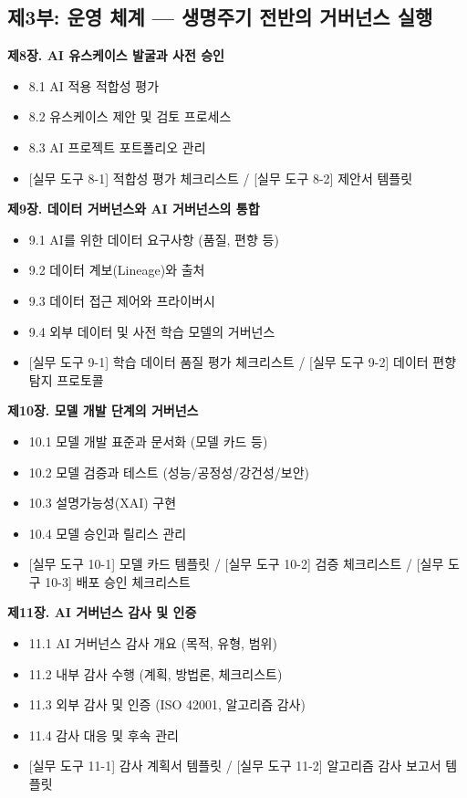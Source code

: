 \vspace{0.5cm}
\subsection*{제3부: 운영 체계 --- 생명주기 전반의 거버넌스 실행}

\textbf{제8장. AI 유스케이스 발굴과 사전 승인}
\begin{itemize}
 \item 8.1 AI 적용 적합성 평가
 \item 8.2 유스케이스 제안 및 검토 프로세스
 \item 8.3 AI 프로젝트 포트폴리오 관리
 \item {[실무 도구 8-1] 적합성 평가 체크리스트} / {[실무 도구 8-2] 제안서 템플릿}
\end{itemize}

\medskip
\textbf{제9장. 데이터 거버넌스와 AI 거버넌스의 통합}
\begin{itemize}
 \item 9.1 AI를 위한 데이터 요구사항 (품질, 편향 등)
 \item 9.2 데이터 계보(Lineage)와 출처
 \item 9.3 데이터 접근 제어와 프라이버시
 \item 9.4 외부 데이터 및 사전 학습 모델의 거버넌스
 \item {[실무 도구 9-1] 학습 데이터 품질 평가 체크리스트} / {[실무 도구 9-2] 데이터 편향 탐지 프로토콜}
\end{itemize}

\medskip
\textbf{제10장. 모델 개발 단계의 거버넌스}
\begin{itemize}
 \item 10.1 모델 개발 표준과 문서화 (모델 카드 등)
 \item 10.2 모델 검증과 테스트 (성능/공정성/강건성/보안)
 \item 10.3 설명가능성(XAI) 구현
 \item 10.4 모델 승인과 릴리스 관리
 \item {[실무 도구 10-1] 모델 카드 템플릿} / {[실무 도구 10-2] 검증 체크리스트} / {[실무 도구 10-3] 배포 승인 체크리스트}
\end{itemize}

\medskip
\textbf{제11장. AI 거버넌스 감사 및 인증}
\begin{itemize}
 \item 11.1 AI 거버넌스 감사 개요 (목적, 유형, 범위)
 \item 11.2 내부 감사 수행 (계획, 방법론, 체크리스트)
 \item 11.3 외부 감사 및 인증 (ISO 42001, 알고리즘 감사)
 \item 11.4 감사 대응 및 후속 관리
 \item {[실무 도구 11-1] 감사 계획서 템플릿} / {[실무 도구 11-2] 알고리즘 감사 보고서 템플릿}
\end{itemize}


